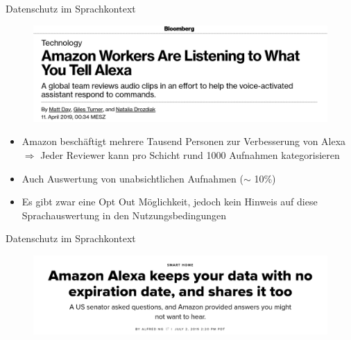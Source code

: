 \documentclass[aspectratio=169]{beamer}
\begin{document}
\begin{frame}{Datenschutz im Sprachkontext}
	\begin{figure}
		\includegraphics[scale=0.3]{images/alexa-audio-reviews}
	\end{figure}
	\begin{itemize} 
		\item Amazon beschäftigt mehrere Tausend Personen zur Verbesserung von Alexa $\Rightarrow$ Jeder Reviewer kann pro Schicht rund 1000 Aufnahmen kategorisieren
		\item Auch Auswertung von unabsichtlichen Aufnahmen ($\sim$ 10\%)
		\item Es gibt zwar eine Opt Out Möglichkeit, jedoch kein Hinweis auf diese Sprachauswertung in den Nutzungsbedingungen
	\end{itemize}
\end{frame}

\begin{frame}{Datenschutz im Sprachkontext}
	\begin{figure}
		\includegraphics[scale=1.4]{images/alexa-no-expiration}
	\end{figure}
\end{frame}
\end{document}

